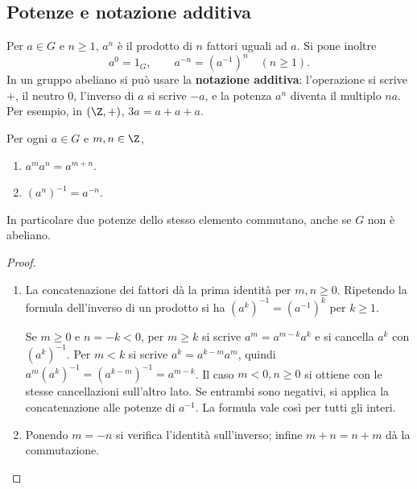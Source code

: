\subsection{Potenze e notazione additiva}
\begin{definizione}
Per $a\in G$ e $n\ge1$, $a^n$ è il prodotto di $n$ fattori uguali ad $a$. Si pone inoltre
\[
a^0=1_G,\qquad a^{-n}=(a^{-1})^n\quad(n\ge1).
\]
In un gruppo abeliano si può usare la \textbf{notazione additiva}: l'operazione si scrive $+$, il neutro $0$, l'inverso di $a$ si scrive $-a$, e la potenza $a^n$ diventa il multiplo $na$. Per esempio, in $(\Z,+)$, $3a=a+a+a$.
\end{definizione}

\begin{proposizione}\label{prop:potenze-gruppo}
Per ogni $a\in G$ e $m,n\in\Z$,
\begin{enumerate}[label=\arabic*.]
\item $a^ma^n=a^{m+n}$.
\item $(a^n)^{-1}=a^{-n}$.
\end{enumerate}
In particolare due potenze dello stesso elemento commutano, anche se $G$ non è abeliano.
\end{proposizione}
\begin{proof}
\begin{enumerate}[label=\arabic*.]
\item La concatenazione dei fattori dà la prima identità per $m,n\ge0$. Ripetendo la formula dell'inverso di un prodotto si ha $(a^k)^{-1}=(a^{-1})^k$ per $k\ge1$.

Se $m\ge0$ e $n=-k<0$, per $m\ge k$ si scrive $a^m=a^{m-k}a^k$ e si cancella $a^k$ con $(a^k)^{-1}$. Per $m<k$ si scrive $a^k=a^{k-m}a^m$, quindi $a^m(a^k)^{-1}=(a^{k-m})^{-1}=a^{m-k}$. Il caso $m<0,n\ge0$ si ottiene con le stesse cancellazioni sull'altro lato. Se entrambi sono negativi, si applica la concatenazione alle potenze di $a^{-1}$. La formula vale così per tutti gli interi.
\item Ponendo $m=-n$ si verifica l'identità sull'inverso; infine $m+n=n+m$ dà la commutazione.
\end{enumerate}
\end{proof}

